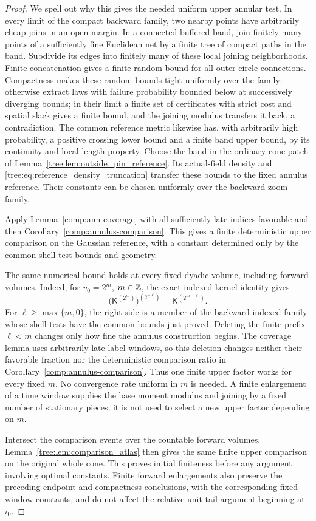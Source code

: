 \begin{proof}
We spell out why this gives the needed uniform upper annular test.
In every limit of the compact backward family, two nearby points have
arbitrarily cheap joins in an open margin.  In a connected buffered
band, join finitely many points of a sufficiently fine Euclidean net
by a finite tree of compact paths in the band.  Subdivide its edges
into finitely many of these local joining neighborhoods.  Finite
concatenation gives a finite random bound for all outer-circle
connections.  Compactness makes these random bounds tight uniformly
over the family: otherwise extract laws with failure probability
bounded below at successively diverging bounds; in their limit a
finite set of certificates with strict cost and spatial slack gives
a finite bound, and the joining modulus transfers it back, a
contradiction.  The common reference metric likewise has, with
arbitrarily high probability, a positive crossing lower bound and a
finite band upper bound, by its continuity and local length property.
Choose the band in the ordinary cone patch of
Lemma~\ref{tree:lem:outside_pin_reference}. Its actual-field density
and \eqref{tree:eq:reference_density_truncation} transfer these bounds
to the fixed annulus reference.  Their constants can be chosen uniformly
over the backward zoom family.

Apply Lemma~\ref{comp:ann-coverage} with all sufficiently late
indices favorable and then Corollary~\ref{comp:annulus-comparison}.
This gives a finite deterministic upper comparison on the Gaussian
reference, with a constant determined only by the common shell-test
bounds and geometry.

The same numerical bound holds at every fixed dyadic volume, including
forward volumes. Indeed, for $v_0=2^m$, $m\in\mathbb Z$, the exact
indexed-kernel identity gives
\begin{equation}\label{tree:eq:forward_index_tail}
 \big(\mathsf K^{(2^m)}\big)^{(2^{-\ell})}
        =\mathsf K^{(2^{m-\ell})}.
\end{equation}
For $\ell\ge\max\{m,0\}$, the right side is a member of the backward indexed
family whose shell tests have the common bounds just proved.
Deleting the finite prefix $\ell<m$ changes only how fine the
annulus construction begins. The coverage lemma uses arbitrarily late
label windows, so this deletion changes neither their favorable
fraction nor the deterministic comparison ratio in
Corollary~\ref{comp:annulus-comparison}. Thus one finite upper factor
works for every fixed $m$. No convergence rate uniform in $m$ is
needed. A finite enlargement of a time window supplies the base
moment modulus and joining by a fixed number of stationary pieces;
it is not used to select a new upper factor depending on $m$.

Intersect the comparison events over the countable forward volumes.
Lemma~\ref{tree:lem:comparison_atlas} then gives the same finite upper
comparison on the original whole cone. This proves initial finiteness
before any argument involving optimal constants. Finite forward
enlargements also preserve the preceding endpoint and compactness
conclusions, with the corresponding fixed-window constants, and do
not affect the relative-unit tail argument beginning at $i_0$.
\end{proof}



